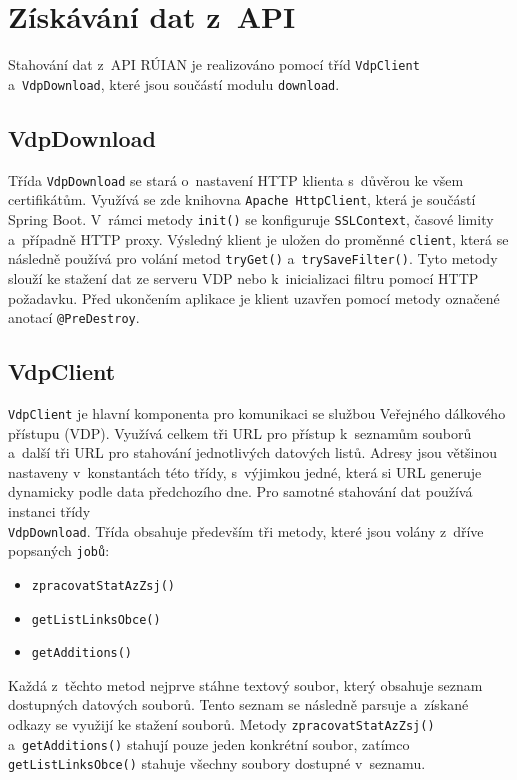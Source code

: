 
\section{Získávání dat z~API}
Stahování dat z~API RÚIAN je realizováno pomocí tříd \texttt{VdpClient} a~\texttt{VdpDownload},  
které jsou součástí modulu \texttt{download}.

\subsection{VdpDownload}
Třída \texttt{VdpDownload} se stará o~nastavení HTTP klienta s~důvěrou ke všem certifikátům.  
Využívá se zde knihovna \texttt{Apache HttpClient}, která je součástí Spring Boot.  
V~rámci metody \texttt{init()} se konfiguruje \texttt{SSLContext}, časové limity a~případně HTTP proxy.  
Výsledný klient je uložen do proměnné \texttt{client}, která se následně používá pro volání metod \texttt{tryGet()} a~\texttt{trySaveFilter()}.  
Tyto metody slouží ke stažení dat ze serveru VDP nebo k~inicializaci filtru pomocí HTTP požadavku.  
Před ukončením aplikace je klient uzavřen pomocí metody označené anotací \texttt{@PreDestroy}.

\subsection{VdpClient}
\texttt{VdpClient} je hlavní komponenta pro komunikaci se službou Veřejného dálkového přístupu (VDP).  
Využívá celkem tři URL pro přístup k~seznamům souborů a~další tři URL pro stahování jednotlivých datových listů.  
Adresy jsou většinou nastaveny v~konstantách této třídy, s~výjimkou jedné, která si URL generuje dynamicky podle data předchozího dne.  
Pro samotné stahování dat používá instanci třídy \\ \texttt{VdpDownload}.
Třída obsahuje především tři metody, které jsou volány z~dříve popsaných \texttt{jobů}:
\begin{itemize}[itemsep=0pt]
    \item \texttt{zpracovatStatAzZsj()}
    \item \texttt{getListLinksObce()}
    \item \texttt{getAdditions()}
\end{itemize}

Každá z~těchto metod nejprve stáhne textový soubor, který obsahuje seznam dostupných datových souborů.  
Tento seznam se následně parsuje a~získané odkazy se využijí ke stažení souborů.  
Metody \texttt{zpracovatStatAzZsj()} a~\texttt{getAdditions()} stahují pouze jeden konkrétní soubor,  
zatímco \texttt{getListLinksObce()} stahuje všechny soubory dostupné v~seznamu.

